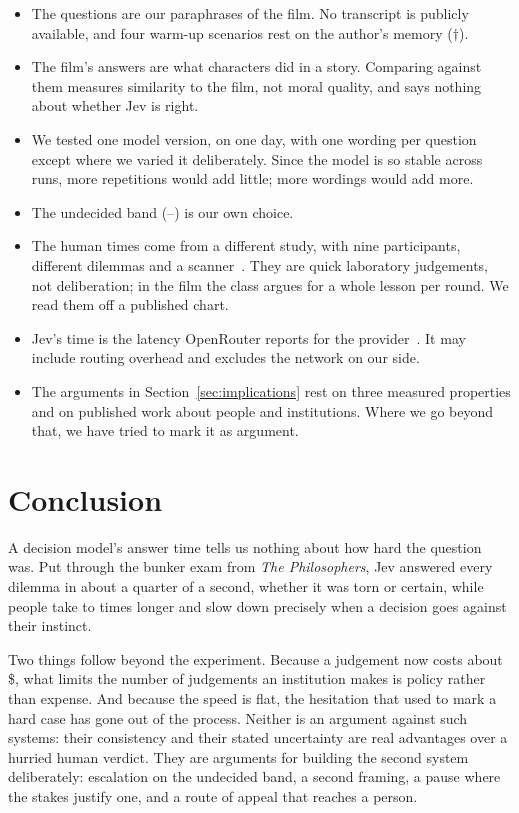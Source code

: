 \documentclass[journal]{IEEEtran}
\begin{document}
\begin{itemize}[leftmargin=1.2em]
  \item The questions are our paraphrases of the film. No transcript is publicly available, and
    four warm-up scenarios rest on the author's memory ($\dagger$).
  \item The film's answers are what characters did in a story. Comparing against them measures
    similarity to the film, not moral quality, and says nothing about whether Jev is right.
  \item We tested one model version, on one day, with one wording per question except where we
    varied it deliberately. Since the model is so stable across runs, more repetitions would add
    little; more wordings would add more.
  \item The undecided band (\BandLo--\BandHi) is our own choice.
  \item The human times come from a different study, with nine participants, different dilemmas
    and a scanner~\cite{greene2001}. They are quick laboratory judgements, not deliberation; in
    the film the class argues for a whole lesson per round. We read them off a published chart.
  \item Jev's time is the latency OpenRouter reports for the provider~\cite{openrouter_generation}.
    It may include routing overhead and excludes the network on our side.
  \item The arguments in Section~\ref{sec:implications} rest on three measured properties and on
    published work about people and institutions. Where we go beyond that, we have tried to mark
    it as argument.
\end{itemize}


\section{Conclusion}

A decision model's answer time tells us nothing about how hard the question was. Put through the
bunker exam from \emph{The Philosophers}, Jev answered every dilemma in about a quarter of a
second, whether it was torn or certain, while people take \SpeedupLow{} to \SpeedupHigh{} times
longer and slow down precisely when a decision goes against their instinct.

Two things follow beyond the experiment. Because a judgement now costs about
\$\CostPerDecision, what limits the number of judgements an institution makes is policy rather
than expense. And because the speed is flat, the hesitation that used to mark a hard case has gone
out of the process. Neither is an argument against such systems: their consistency and their
stated uncertainty are real advantages over a hurried human verdict. They are arguments for
building the second system deliberately: escalation on the undecided band, a second framing, a
pause where the stakes justify one, and a route of appeal that reaches a person.
\end{document}
